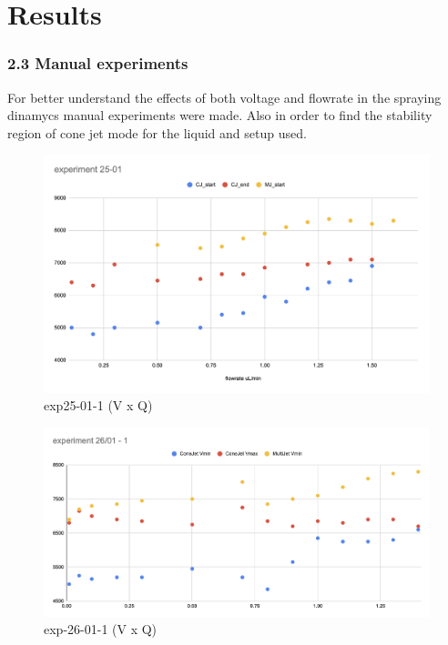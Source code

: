 \chapter{Results}


\subsection*{2.3 Manual experiments}

For better understand the effects of both voltage and flowrate in the spraying dinamycs manual experiments were made.
Also in order to find the stability region of cone jet mode for the liquid and setup used.


    \begin{figure}[H]
        \center
        \includegraphics[width=12cm]{Figuras/report3/exp25-01-1.png}
        \caption{ exp25-01-1 (V x Q)}
    \end{figure}

    \begin{figure}[H]
        \center
        \includegraphics[width=12cm]{Figuras/report3/exp-26-01-1.png}
        \caption{ exp-26-01-1 (V x Q)}
    \end{figure}

